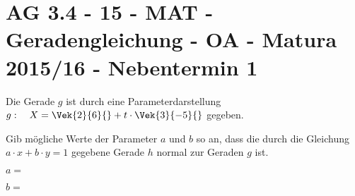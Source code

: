 \section{AG 3.4 - 15 - MAT - Geradengleichung - OA - Matura 2015/16
- Nebentermin 1}

\begin{beispiel}[AG 3.4]{1} %
Die Gerade $g$ ist durch eine Parameterdarstellung $g:\quad X=\Vek{2}{6}{}+t\cdot \Vek{3}{-5}{}$ gegeben. \leer

Gib mögliche Werte der Parameter $a$ und $b$ so an, dass die durch die Gleichung $a\cdot x+b\cdot y=1$ gegebene Gerade $h$ normal zur Geraden $g$ ist. \leer

$a=$ 

$b=$ 
\end{beispiel}